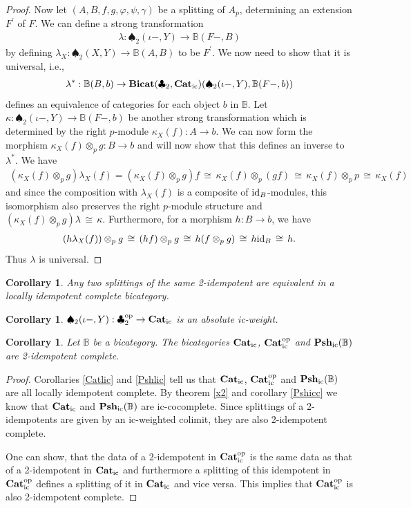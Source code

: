 \documentclass[12pt,oneside,reqno,a4paper]{article}
\newtheorem{corollary}[theorem]{Corollary}
\theoremstyle{definition}
\newcommand{\op}{^\textup{op}}
\newcommand{\Catic}{\textbf{\textup{Cat}}_\textup{ic}}
\newcommand{\Bicat}{\textbf{\textup{Bicat}}}
\newcommand{\Pshic}[1]{\textbf{\textup{Psh}}_\textup{ic}(#1)}
\newcommand{\clb}{\clubsuit}
\newcommand{\spd}{\spadesuit}
\renewcommand{\phi}{\varphi}
\newcommand{\iso}{\,\cong\,}
\newcommand{\id}{\textup{id}}
\newcommand{\bB}{\mathbb{B}}
\newcommand{\p}{^\prime}
\begin{document}
\begin{proof}
Now let $(A,B,f,g,\phi,\psi,\gamma)$ be a splitting of $A_p$, determining an extension $F\p$ of $F$. We can define a strong transformation
\begin{align*}
\lambda:\spd_2(\iota-,Y)\to \bB(F-,B)
\end{align*}
by defining $\lambda_X:\spd_2(X,Y)\to \bB(A,B)$ to be $F\p$. We now need to show that it is universal, i.e.,
\begin{align*}
\lambda^*:\bB(B,b)\to \Bicat(\clb_2,\Catic)(\spd_2(\iota-,Y),\bB(F-,b))
\end{align*}
defines an equivalence of categories for each object $b$ in $\bB$. Let $\kappa:\spd_2(\iota-,Y)\to \bB(F-,b)$ be another strong transformation which is determined by the right $p$-module $\kappa_X(f):A\to b$. We can now form the morphism $\kappa_X(f)\otimes_p g:B\to b$ and will now show that this defines an inverse to $\lambda^*$. We have
\begin{align*}
(\kappa_X(f)\otimes_p g)\lambda_X(f)=(\kappa_X(f)\otimes_p g)f \iso \kappa_X(f)\otimes_p (gf)\iso \kappa_X(f)\otimes_p p\iso \kappa_X(f)
\end{align*}
and since the composition with $\lambda_X(f)$ is a composite of $\id_B$-modules, this isomorphism also preserves the right $p$-module structure and $(\kappa_X(f)\otimes_p g)\lambda \iso \kappa$. Furthermore, for a morphism $h:B\to b$, we have
\begin{align*}
\left(h\lambda_X(f)\right) \otimes_p g\iso (hf)\otimes_p g \iso h(f\otimes_p g) \iso h\id_B\iso h.
\end{align*}
Thus $\lambda$ is universal.
\end{proof}

\begin{corollary} \label{x4}
Any two splittings of the same 2-idempotent are equivalent in a locally idempotent complete bicategory.
\end{corollary}

\begin{corollary}
$\spd_2(\iota-,Y):\clb_2\op\to\Catic$ is an absolute ic-weight.
\end{corollary}

\begin{corollary}
Let $\bB$ be a bicategory. The bicategories $\Catic$, $\Catic\op$ and $\Pshic{\bB}$ are 2-idempotent complete.
\end{corollary}

\begin{proof}
Corollaries \ref{Catlic} and \ref{Pshlic} tell us that $\Catic$, $\Catic\op$ and $\Pshic{\bB}$ are all locally idempotent complete. By theorem \ref{x2} and corollary \ref{Pshicc} we know that $\Catic$ and $\Pshic{\bB}$ are ic-cocomplete. Since splittings of a 2-idempotents are given by an ic-weighted colimit, they are also 2-idempotent complete.

One can show, that the data of a 2-idempotent in $\Catic\op$ is the same data as that of a 2-idempotent in $\Catic$ and furthermore a splitting of this idempotent in $\Catic\op$ defines a splitting of it in $\Catic$ and vice versa. This implies that $\Catic\op$ is also 2-idempotent complete.
\end{proof}
\end{document}
